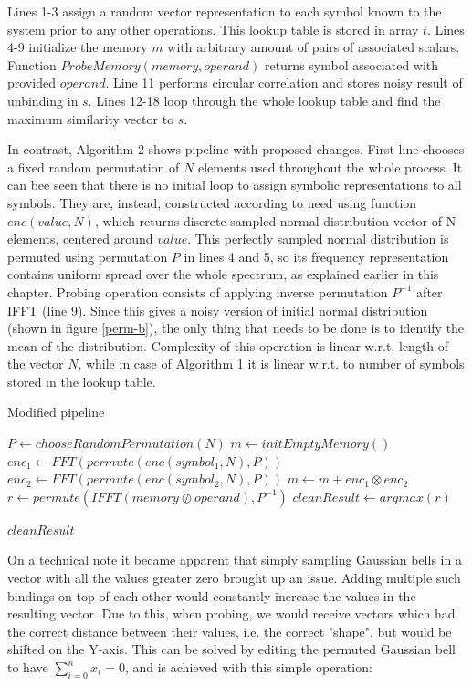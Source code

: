 \documentclass[conference]{IEEEtran}
\begin{document}
	
	Lines 1-3 assign a random vector representation to each symbol known to the system prior to any other operations. This lookup table is stored in array $t$. Lines 4-9 initialize the memory $m$ with arbitrary amount of pairs of associated scalars. Function $ProbeMemory(memory, operand)$ returns symbol associated with provided $operand$. Line 11 performs circular correlation and stores noisy result of unbinding in $s$. Lines 12-18 loop through the whole lookup table and find the maximum similarity vector to $s$.
		
		In contrast, Algorithm 2 shows pipeline with proposed changes. First line chooses a fixed random permutation of $N$ elements used throughout the whole process. It can bee seen that there is no initial loop to assign symbolic representations to all symbols. They are, instead, constructed according to need using function $enc(value, N)$, which returns discrete sampled normal distribution vector of N elements, centered around $value$. This perfectly sampled normal distribution is permuted using permutation $P$ in lines 4 and 5, so its frequency representation contains uniform spread over the whole spectrum, as explained earlier in this chapter. Probing operation consists of applying inverse permutation $P^{-1}$ after IFFT (line 9). Since this gives a noisy version of initial normal distribution (shown in figure \ref{perm-b}), the only thing that needs to be done is to identify the mean of the distribution. Complexity of this operation is linear w.r.t. length of the vector $N$, while in case of Algorithm 1 it is linear w.r.t. to number of symbols stored in the lookup table.
		
	\begin{algorithm}
		\caption{Modified pipeline}
		\begin{algorithmic}[1]
			\State $P \gets chooseRandomPermutation(N)$
			\State $m \gets initEmptyMemory()$
			\State $enc_1 \gets FFT(permute(enc(symbol_1, N), P))$
			\State $enc_2 \gets FFT(permute(enc(symbol_2, N), P))$
			\State $m \gets m + enc_1 \otimes enc_2$
			\EndFor	
			\State $r \gets permute(IFFT(memory \oslash operand), P^{-1})$
			\State $cleanResult \gets argmax(r)$
			
			\Return $cleanResult$
			\EndFunction
		\end{algorithmic}
	\end{algorithm}
	
	On a technical note it became apparent that simply sampling Gaussian bells in a vector with all the values greater zero brought up an issue.
Adding multiple such bindings on top of each other would constantly increase the values in the resulting vector.
Due to this, when probing, we would receive vectors which had the correct distance between their values, i.e.
the correct "shape", but would be shifted on the Y-axis.
This can be solved by editing the permuted Gaussian bell to have \(\sum_{i=0}^n x_i = 0\), and is achieved with this simple operation:
	
\end{document}
